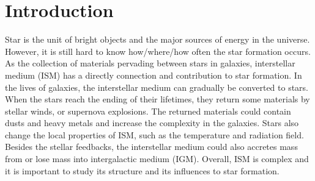 
\newcommand{\KROME}{{\texttt{KROME}}}
\newcommand{\ENZO}{{\texttt{ENZO}}}
\newcommand{\UCLCHEM}{{\texttt{UCLCHEM}}}

\chapter{Introduction\label{ch:intro}}

Star is the unit of bright objects and the major sources of energy in the universe. However, it is still hard to know how/where/how often the star formation occurs. As the collection of materials pervading between stars in galaxies, interstellar medium (ISM) has a directly connection and contribution to star formation. In the lives of galaxies, the interstellar medium can gradually be converted to stars. When the stars reach the ending of their lifetimes, they return some materials by stellar winds, or supernova explosions. The returned materials could contain dusts and heavy metals and increase the complexity in the galaxies. Stars also change the local properties of ISM, such as the temperature and radiation field. Besides the stellar feedbacks, the interstellar medium could also accretes mass from or lose mass into intergalactic medium (IGM). Overall, ISM is complex and it is important to study its structure and its influences to star formation.

